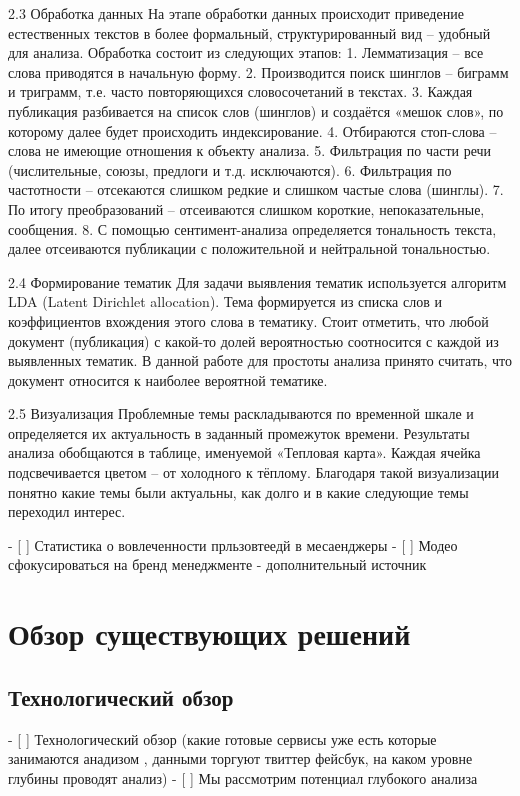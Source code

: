 \documentclass[a4paper,article,14pt]{extarticle}
\begin{document}
2.3 Обработка данных
На этапе обработки данных происходит приведение естественных текстов в более формальный, структурированный вид – удобный для анализа.
Обработка состоит из следующих этапов:
1.	Лемматизация – все слова приводятся в начальную форму.
2.	Производится поиск шинглов – биграмм и триграмм, т.е. часто повторяющихся словосочетаний в текстах.
3.	Каждая публикация разбивается на список слов (шинглов) и создаётся «мешок слов», по которому далее будет происходить индексирование.
4.	Отбираются стоп-слова – слова не имеющие отношения к объекту анализа.
5.	Фильтрация по части речи (числительные, союзы, предлоги и т.д. исключаются).
6.	Фильтрация по частотности – отсекаются слишком редкие и слишком частые слова (шинглы).
7.	По итогу преобразований – отсеиваются слишком короткие, непоказательные, сообщения.
8.	С помощью сентимент-анализа определяется тональность текста, далее отсеиваются публикации с положительной и нейтральной тональностью.

2.4 Формирование тематик
Для задачи выявления тематик используется алгоритм LDA (Latent Dirichlet allocation). Тема формируется из списка слов и коэффициентов вхождения этого слова в тематику. Стоит отметить, что любой документ (публикация) с какой-то долей вероятностью соотносится с каждой из выявленных тематик. В данной работе для простоты анализа принято считать, что документ относится к наиболее вероятной тематике.

2.5 Визуализация
Проблемные темы раскладываются по временной шкале и определяется их актуальность в заданный промежуток времени. Результаты анализа обобщаются в таблице, именуемой «Тепловая карта». Каждая ячейка подсвечивается цветом – от холодного к тёплому. Благодаря такой визуализации понятно какие темы были актуальны, как долго и в какие следующие темы переходил интерес.


- [ ] Статистика о вовлеченности прльзовтеедй в месаенджеры
    - [ ] Модео сфокусироваться на бренд менеджменте - дополнительный источник

\section{Обзор существующих решений}
\subsection{Технологический обзор}

    - [ ] Технологический обзор (какие готовые сервисы уже есть которые занимаются анадизом , данными торгуют твиттер фейсбук, на каком уровне глубины проводят анализ)
    - [ ] Мы рассмотрим потенциал глубокого анализа
\end{document}
